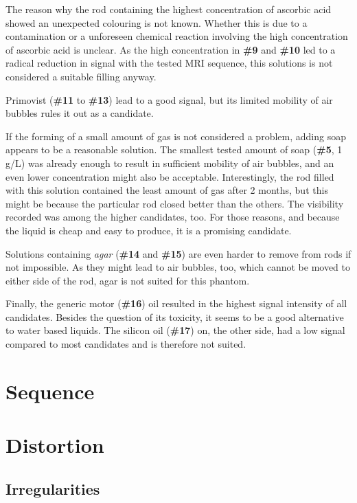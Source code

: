 The reason why the rod containing the highest concentration of ascorbic acid showed an unexpected colouring is not known.
Whether this is due to a contamination or a unforeseen chemical reaction involving the high concentration of ascorbic acid is unclear.
As the high concentration in \textbf{\#9} and \textbf{\#10} led to a radical reduction in signal with the tested MRI sequence, this solutions is not considered a suitable filling anyway.

Primovist (\textbf{\#11} to \textbf{\#13}) lead to a good signal, but its limited mobility of air bubbles rules it out as a candidate.

If the forming of  a small amount of gas is not considered a problem, adding soap appears to be a reasonable solution.
The smallest tested amount of soap (\textbf{\#5}, 1 g/L) was already enough to result in sufficient mobility of air bubbles, and an even lower concentration might also be acceptable.
Interestingly, the rod filled with this solution contained the least amount of gas after 2 months, but this might be because the particular rod closed better than the others.
The visibility recorded was among the higher candidates, too.
For those reasons, and because the liquid is cheap and easy to produce, it is a promising candidate.

Solutions containing \textit{agar} (\textbf{\#14} and \textbf{\#15}) are even harder to remove from rods if not impossible.
As they might lead to air bubbles, too, which cannot be moved to either side of the rod, agar is not suited for this phantom.

Finally, the generic motor (\textbf{\#16}) oil resulted in the highest signal intensity of all candidates.
Besides the question of its toxicity, it seems to be a good alternative to water based liquids.
The silicon oil (\textbf{\#17}) on, the other side, had a low signal compared to most candidates and is therefore not suited.


\section{Sequence}

\section{Distortion}


\subsection{Irregularities}

